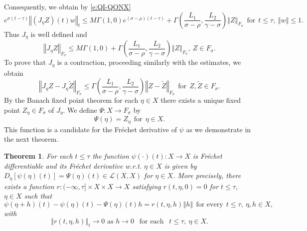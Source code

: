 \documentclass[a4paper,11pt,reqno]{amsart}
\theoremstyle{plain}
\newtheorem{thm}[lem]{Theorem}
\theoremstyle{definition}
\numberwithin{equation}{section}
\newcommand{\norm}[1]{\left\Vert#1\right\Vert}
\renewcommand{\leq}{\leqslant}
\begin{document}
Consequently, we obtain by \eqref{e:QI-QONX}
$$e^{\sigma(t-\tau)}\norm{(J_\eta Z)(t)w}_{t}\leq M\Gamma(1,0)e^{(\sigma-\rho)(t-\tau)}+\Gamma\left(\frac{L_1}{\sigma-\rho},\frac{L_2}{\gamma-\sigma}\right)\norm{Z}_{F_\sigma}\ \ \text{for}\ \ t\leq\tau,\ \norm{w}\leq 1.$$
Thus $J_\eta$ is well defined and
\begin{equation*}%
\norm{J_\eta Z}_{F_\sigma}\leq M\Gamma(1,0)+\Gamma\left(\frac{L_1}{\sigma-\rho},\frac{L_2}{\gamma-\sigma}\right)\norm{Z}_{F_\sigma},\ Z\in F_\sigma.
\end{equation*}
To prove that $J_\eta$ is a contraction, proceeding similarly with the estimates, we obtain
$$\norm{J_\eta Z-J_\eta\tilde Z}_{F_\sigma}\leq \Gamma\left(\frac{L_1}{\sigma-\rho},\frac{L_2}{\gamma-\sigma}\right)\norm{Z-\tilde Z}_{F_\sigma}\ \ \text{for}\ \ Z,\tilde Z\in F_\sigma.$$
By the Banach fixed point theorem for each $\eta\in X$ there exists a unique fixed point $Z_\eta\in F_\sigma$ of $J_\eta$.
We define $\Psi\colon X\to F_\sigma$ by
\begin{equation}\label{e:DEFPSI}
\Psi(\eta)=Z_{\eta}\ \ \text{for}\ \ \eta\in X.
\end{equation}
This function is a candidate for the  Fr\'echet derivative of $\psi$ as we demonstrate in the next theorem. 


\begin{thm}\label{thm:DIFFPSI}
For each $t\leq\tau$ the function $\psi(\cdot)(t)\colon X\to X$ is  Fr\'echet differentiable and its Fr\'echet derivative w.r.t. $\eta\in X$ is given by $D_\eta[\psi(\eta)(t)]=\Psi(\eta)(t)\in\mathcal{L}(X,X)$ for $\eta\in X$.
More precisely, there exists a function $r\colon(-\infty,\tau]\times X\times X\to X$ satisfying $r(t,\eta,0)=0$ for $t\leq\tau$, $\eta\in X$ such that
\begin{equation}\label{e:RESTPSI}
\psi(\eta+h)(t)-\psi(\eta)(t)-\Psi(\eta)(t)h=r(t,\eta,h)\norm{h}\ \ \text{for every}\ \  t\leq\tau,\ \eta, h\in X,
\end{equation}
with
\begin{equation*}
\norm{r(t,\eta,h)}_{t}\to 0\text{ as }h\to 0\ \ \text{  for each  }\ \ t\leq\tau,\ \eta\in X.
\end{equation*}
\end{thm}
\end{document}
